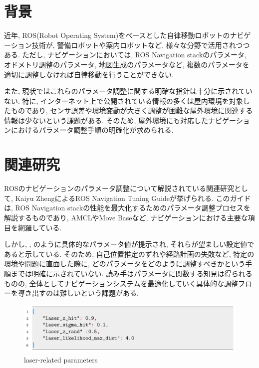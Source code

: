 
\section{背景}
近年, ROS(Robot Operating System)をベースとした自律移動ロボットのナビゲーション技術が, 警備ロボットや案内ロボットなど, 様々な分野で活用されつつある. 
ただし, ナビゲーションにおいては, ROS Navigation stack\cite{navstack}のパラメータ, オドメトリ調整のパラメータ, 地図生成のパラメータなど, 複数のパラメータを
適切に調整しなければ自律移動を行うことができない. 

また, 現状ではこれらのパラメータ調整に関する明確な指針は十分に示されていない. 
特に, インターネット上で公開されている情報の多くは屋内環境を対象したものであり, 
センサ誤差や環境変動が大きく調整が困難な屋外環境に関連する情報は少ないという課題がある. 
そのため, 屋外環境にも対応したナビゲーションにおけるパラメータ調整手順の明確化が求められる. 
\newpage
\section{関連研究}
ROSのナビゲーションのパラメータ調整について解説されている関連研究として, Kaiyu Zheng\cite{zheng2017rosnavigation}によるROS Navigation Tuning Guideが挙げられる. 
このガイドは, ROS Navigation stackの性能を最大化するためのパラメータ調整プロセスを解説するものであり, AMCLやMove Baseなど, ナビゲーションにおける主要な項目を網羅している. 

しかし, , のように具体的なパラメータ値が提示され, それらが望ましい設定値であると示している. 
そのため, 自己位置推定のずれや経路計画の失敗など, 特定の環境や問題に直面した際に, どのパラメータをどのように調整すべきかという手順までは明確に示されていない. 
読み手はパラメータに関数する知見は得られるものの, 全体としてナビゲーションシステムを最適化していく具体的な調整フローを導き出すのは難しいという課題がある. 
\begin{figure}[hbtp]
  \centering
 \includegraphics[keepaspectratio, scale=0.3]
      {images/senkou_1.png}
 \caption{laser-related parameters}
 \label{Fig:laser-related parameters}
\end{figure}

